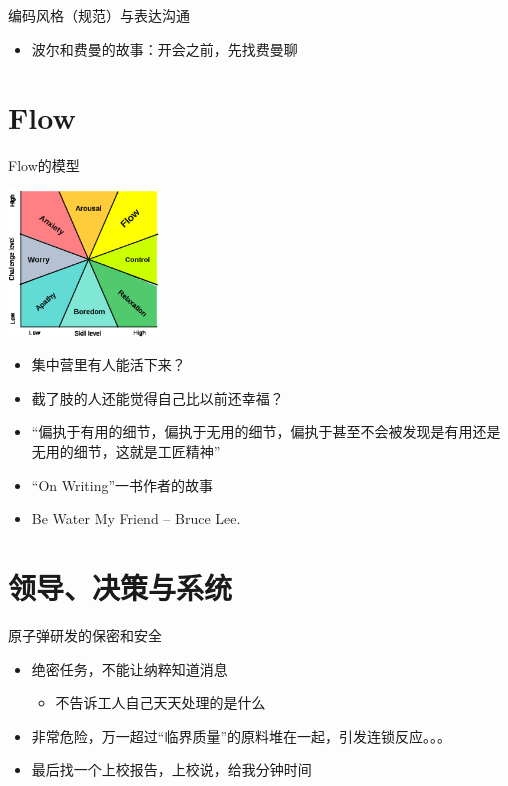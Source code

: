 \documentclass[presentation,dvipdfmx,CJKbookmarks]{beamer}
\begin{document}
\begin{CJK*}{UTF8}{simsun}
\begin{frame}[fragile,label={sec:orgfa73be3}]{编码风格（规范）与表达沟通}
\begin{itemize}[<+->]
\begin{itemize}
\item 波尔和费曼的故事：开会之前，先找费曼聊
\end{itemize}
\end{itemize}
\end{frame}

\section{Flow}
\label{sec:org737b2dd}

\begin{frame}[label={sec:orgb20f83e}]{}
\begin{block}{Flow\thinspace 的模型}
\begin{center}
\includegraphics[width=4cm]{./images/flow.ps}
\end{center}
\pause
\begin{itemize}[<+->]
\item 集中营里有人能活下来？
\item 截了肢的人还能觉得自己比以前还幸福？
\item “偏执于有用的细节，偏执于无用的细节，偏执于甚至不会被发现是有用还是无用的细节，这就是工匠精神”
\item “On Writing”一书作者的故事
\item Be Water My Friend -- Bruce Lee.
\end{itemize}
\end{block}
\end{frame}

\section{领导、决策与系统}
\label{sec:orge382ef3}

\begin{frame}[label={sec:org0c3301d}]{原子弹研发的保密和安全}
\begin{itemize}
\item 绝密任务，不能让纳粹知道消息
\begin{itemize}
\item 不告诉工人自己天天处理的是什么
\end{itemize}
\item 非常危险，万一超过“临界质量”的原料堆在一起，引发连锁反应。。。
\item 最后找一个上校报告，上校说，给我\thinspace 分钟时间
\end{itemize}
\end{frame}


\end{CJK*}
\end{document}
